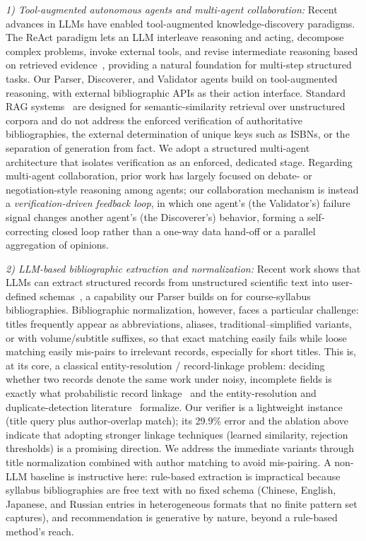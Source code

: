 \documentclass[conference]{IEEEtran}
\begin{document}
\textit{1) Tool-augmented autonomous agents and multi-agent collaboration:}
Recent advances in LLMs have enabled tool-augmented knowledge-discovery
paradigms. The ReAct paradigm lets an LLM interleave reasoning and acting,
decompose complex problems, invoke external tools, and revise intermediate
reasoning based on retrieved evidence~\cite{ReAct}, providing a natural
foundation for multi-step structured tasks. Our Parser, Discoverer, and
Validator agents build on tool-augmented reasoning, with external
bibliographic APIs as their action interface. Standard RAG systems~\cite{RAG}
are designed for semantic-similarity retrieval over unstructured corpora and do
not address the enforced verification of authoritative bibliographies, the
external determination of unique keys such as ISBNs, or the separation of
generation from fact. We adopt a structured multi-agent architecture that
isolates verification as an enforced, dedicated stage. Regarding multi-agent
collaboration, prior work has largely focused on debate- or negotiation-style
reasoning among agents; our collaboration mechanism is instead a
\textit{verification-driven feedback loop}, in which one agent's (the
Validator's) failure signal changes another agent's (the Discoverer's)
behavior, forming a self-correcting closed loop rather than a one-way data
hand-off or a parallel aggregation of opinions.

\textit{2) LLM-based bibliographic extraction and normalization:}
Recent work shows that LLMs can extract structured records from unstructured
scientific text into user-defined schemas~\cite{SIE}, a capability our Parser
builds on for course-syllabus bibliographies. Bibliographic normalization,
however, faces a particular challenge: titles frequently appear as abbreviations,
aliases, traditional--simplified variants, or with volume/subtitle suffixes, so
that exact matching easily fails while loose matching easily mis-pairs to
irrelevant records, especially for short titles. This is, at its core, a
classical entity-resolution / record-linkage problem: deciding whether two
records denote the same work under noisy, incomplete fields is exactly what
probabilistic record linkage~\cite{FellegiSunter} and the entity-resolution and
duplicate-detection literature~\cite{Elmagarmid,Christen} formalize. Our verifier
is a lightweight instance (title query plus author-overlap match); its 29.9\%
error and the ablation above indicate that adopting stronger linkage techniques
(learned similarity, rejection thresholds) is a promising direction. We address
the immediate variants through title normalization combined with author matching
to avoid mis-pairing. A non-LLM baseline is instructive here: rule-based extraction is
impractical because syllabus bibliographies are free text with no fixed
schema (Chinese, English, Japanese, and Russian entries in heterogeneous
formats that no finite pattern set captures), and recommendation is generative
by nature, beyond a rule-based method's reach.
\end{document}
